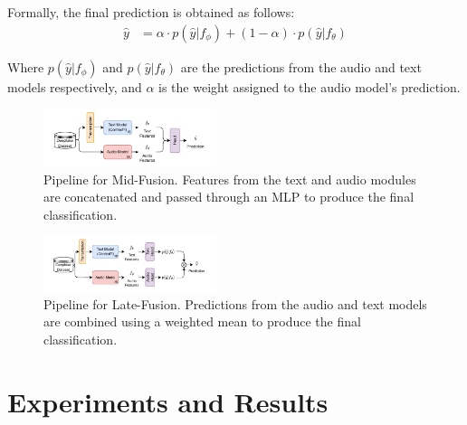 \documentclass{Interspeech}
\begin{document}
Formally, the final prediction is obtained as follows:
\begin{align}
  \hat{y} & = \alpha \cdot p(\hat{y}|f_\phi) + (1-\alpha) \cdot p(\hat{y}|f_\theta)
\end{align}

Where $p(\hat{y}|f_\phi)$ and $p(\hat{y}|f_\theta)$ are the predictions from
the audio and text models respectively, and $\alpha$ is the weight assigned to
the audio model's prediction.



\begin{figure}[t]
  \centering
  \includegraphics[width=0.45\textwidth]{figures/mid_fusion_small.pdf}
  \caption{Pipeline for Mid-Fusion. Features from the text and audio modules are concatenated and passed through an MLP to produce the final classification.}\label{fig:mid_fusion}
\end{figure}

\begin{figure}[t]
  \centering
  \includegraphics[width=0.45\textwidth]{figures/late_fusion_small.pdf}
  \caption{Pipeline for Late-Fusion. Predictions from the audio and text models are combined using a weighted mean to produce the final classification.}\label{fig:late_fusion}
\end{figure}

\section{Experiments and Results}\label{sec:experiments_results}
\end{document}

